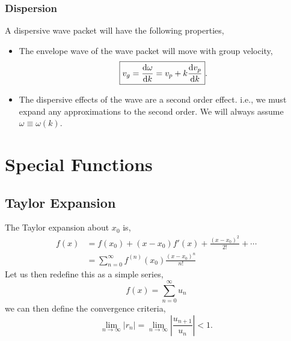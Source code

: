 \documentclass{book}
\begin{document}
\subsection{Dispersion}
A dispersive wave packet will have the following properties,
\begin{itemize}
	\item The envelope wave of the wave packet will move with group velocity,
	\begin{equation}
		\boxed{v_g = \dv{\omega}{k} = v_p + k\dv{v_p}{k}}.
	\end{equation}
	\item The dispersive effects of the wave are a second order effect. i.e., we must expand any approximations to the second order. We will always assume $\omega \equiv \omega(k)$.
\end{itemize}
\chapter{Special Functions}
\section{Taylor Expansion}
The Taylor expansion about $x_0$ is,
\begin{equation}
	\begin{split}
		f(x) & = f(x_0) + (x-x_0)f'(x) + \frac{(x-x_0)^2}{2!} + \cdots \\
		& = \sum_{n=0}^{\infty}f^{(n)}(x_0)\frac{(x-x_0)^n}{n!}
	\end{split}
\end{equation}
Let us then redefine this as a simple series,
\begin{equation}
	f(x) = \sum_{n=0}^{\infty}u_n
\end{equation}
we can then define the convergence criteria,
\begin{equation}
	\lim_{n\to\infty}|r_n| = \lim_{n\to\infty}\left|\frac{u_{n+1}}{u_n}\right| < 1.
\end{equation}
\end{document}
